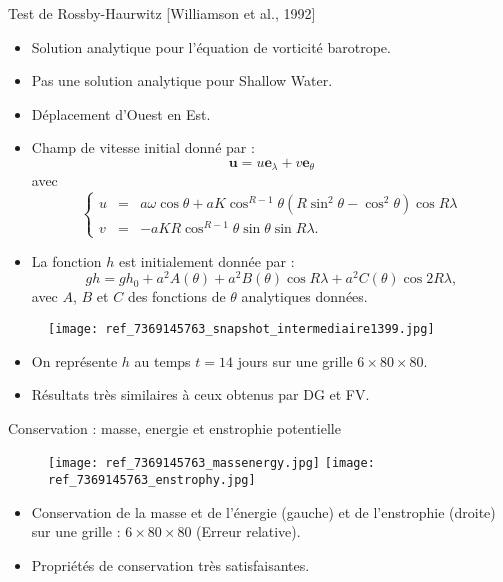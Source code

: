 \documentclass[11pt]{beamer}
\begin{document}
\begin{frame}{Test de Rossby-Haurwitz [Williamson et al., 1992]}
\begin{exampleblock}{}
\begin{itemize}
\item Solution analytique pour l'équation de vorticité barotrope.
\item Pas une solution analytique pour Shallow Water.
\item Déplacement d'Ouest en Est.
\item Champ de vitesse initial donné par :
$$
\mathbf{u} = u \mathbf{e}_{\lambda} + v \mathbf{e}_{\theta}
$$
avec 
$$
\left\lbrace
\begin{array}{rcl}
u & = & a \omega \cos \theta + a K \cos^{R-1} \theta \left( R \sin^2 \theta - \cos^2 \theta \right) \cos R \lambda\\
v & = & - a K R \cos^{R-1} \theta \sin \theta \sin R \lambda.
\end{array}
\right.
$$
\item La fonction $h$ est initialement donnée par :
\begin{equation}
gh = gh_0 + a^2 A(\theta) + a^2 B(\theta) \cos R \lambda + a^2 C(\theta) \cos 2 R \lambda,
\end{equation}
avec $A$, $B$ et $C$ des fonctions de $\theta$ analytiques données.
\end{itemize}
\end{exampleblock}
\end{frame}



\begin{frame}{}
\begin{figure}
\texttt{[image: ref\_7369145763\_snapshot\_intermediaire1399.jpg]}
\end{figure}
\begin{itemize}
\item On représente $h$ au temps $t=14$ jours sur une grille $6 \times 80 \times 80$.
\item Résultats très similaires à ceux obtenus par DG et FV.
\end{itemize}
\end{frame}






\begin{frame}{Conservation : masse, energie et enstrophie potentielle}
\begin{figure}
\texttt{[image: ref\_7369145763\_massenergy.jpg]}
\texttt{[image: ref\_7369145763\_enstrophy.jpg]}
\end{figure}
\begin{itemize}
\item Conservation de la masse et de l'énergie (gauche) et de l'enstrophie (droite) sur une grille : $6 \times 80 \times 80$ (Erreur relative). 

\item Propriétés de conservation très satisfaisantes.
\end{itemize}
\end{frame}
\end{document}
